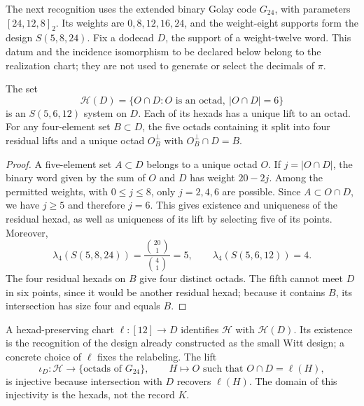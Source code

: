 The next recognition uses the extended binary Golay code
$G_{24}$, with parameters $[24,12,8]_2$. Its weights are
$0,8,12,16,24$, and the weight-eight supports form the design
$S(5,8,24)$. Fix a dodecad $D$, the support of a weight-twelve
word. This datum and the incidence isomorphism to be declared
below belong to the realization chart; they are not used to
generate or select the decimals of $\pi$.

\begin{proposition}
\label{exc:residuo-binario}
The set
\[
 \mathcal H(D)=
 \{O\cap D: O\text{ is an octad},\ |O\cap D|=6\}
\]
is an $S(5,6,12)$ system on $D$. Each of its hexads has
a unique lift to an octad. For any four-element set $B\subset D$,
the five octads containing it split into four residual
lifts and a unique octad $O_B^\perp$ with $O_B^\perp\cap D=B$.
\end{proposition}

\begin{proof}
A five-element set $A\subset D$ belongs to a unique octad $O$. If
$j=|O\cap D|$, the binary word given by the sum of $O$ and $D$ has weight
$20-2j$. Among the permitted weights, with $0\leq j\leq8$, only
$j=2,4,6$ are possible. Since $A\subset O\cap D$, we have $j\geq5$
and therefore $j=6$. This gives existence and uniqueness of the residual
hexad, as well as uniqueness of its lift by selecting five of its
points. Moreover,
\[
 \lambda_4(S(5,8,24))=\frac{\binom{20}1}{\binom41}=5,
 \qquad
 \lambda_4(S(5,6,12))=4.
\]
The four residual hexads on $B$ give four distinct octads.
The fifth cannot meet $D$ in six points, since it would be another residual
hexad; because it contains $B$, its intersection has size four and
equals $B$.
\end{proof}

A hexad-preserving chart $\ell:[12]\to D$ identifies
$\mathcal H$ with $\mathcal H(D)$. Its existence is the recognition
of the design already constructed as the small Witt design; a concrete
choice of $\ell$ fixes the relabeling. The lift
\[
 \iota_D:\mathcal H\longrightarrow
       \{\text{octads of }G_{24}\},
 \qquad H\longmapsto O\text{ such that }O\cap D=\ell(H),
\]
is injective because intersection with $D$ recovers $\ell(H)$.
The domain of this injectivity is the hexads, not the record $K$.


